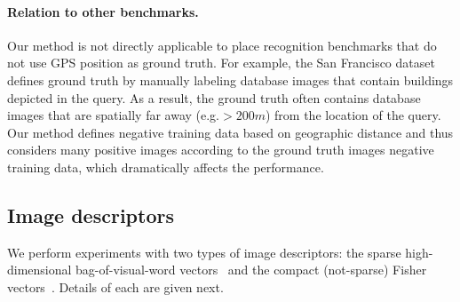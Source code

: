       \paragraph{Relation to other benchmarks.}
       Our method is not directly applicable to place recognition benchmarks that do not use GPS position as ground truth. For example, the San Francisco dataset~\cite{Chen11} defines ground truth by manually labeling database images that contain buildings depicted in the query. As a result, the ground truth often contains database images that are spatially far away (e.g.$> 200m$) from the location of the query.  Our method defines negative training data based on geographic distance and thus considers many positive images according to the ground truth images negative training data, which dramatically affects the performance.   
      

    \subsection{Image descriptors}
      We perform experiments with two types of image descriptors: the sparse high-dimensional bag-of-visual-word vectors~\cite{Sivic03} and the compact (not-sparse) Fisher vectors~\cite{Jegou12}. Details of each are given next.

